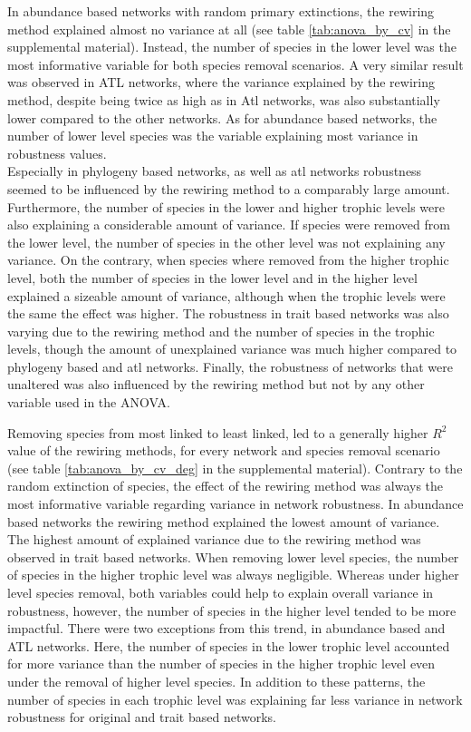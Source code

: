 \documentclass[12pt,a4paper]{article}
\begin{document}
In abundance based networks with random primary extinctions, the rewiring method explained almost no variance at all (see table \ref{tab:anova_by_cv} in the supplemental material). Instead, the number of species in the lower level was the most informative variable for both species removal scenarios. A very similar result was observed in ATL networks, where the variance explained by the rewiring method, despite being twice as high as in Atl networks, was also substantially lower compared to the other networks. As for abundance based networks, the number of lower level species was the variable explaining most variance in robustness values. \\ Especially in phylogeny based networks, as well as atl networks robustness seemed to be influenced by the rewiring method to a comparably large amount. Furthermore, the number of species in the lower and higher trophic levels were also explaining a considerable amount of variance. If species were removed from the lower level, the number of species in the other level was not explaining any variance. On the contrary, when species where removed from the higher trophic level, both the number of species in the lower level and in the higher level explained a sizeable amount of variance, although when the trophic levels were the same the effect was higher. The robustness in trait based networks was also varying due to the rewiring method and the number of species in the trophic levels, though the amount of unexplained variance was much higher compared to phylogeny based and atl networks. Finally, the robustness of networks that were unaltered was also influenced by the rewiring method but not by any other variable used in the ANOVA. \par
Removing species from most linked to least linked, led to a generally higher $R^2$ value of the rewiring methods, for every network and species removal scenario (see table \ref{tab:anova_by_cv_deg} in the supplemental material). Contrary to the random extinction of species, the effect of the rewiring method was always the most informative variable regarding variance in network robustness. In abundance based networks the rewiring method explained the lowest amount of variance. The highest amount of explained variance due to the rewiring method was observed in trait based networks. When removing lower level species, the number of species in the higher trophic level was always negligible. Whereas under higher level species removal, both variables could help to explain overall variance in robustness, however, the number of species in the higher level tended to be more impactful. There were two exceptions from this trend, in abundance based and ATL networks. Here, the number of species in the lower trophic level accounted for more variance than the number of species in the higher trophic level even under the removal of higher level species. In addition to these patterns, the number of species in each trophic level was explaining far less variance in network robustness for original and trait based networks. 
\end{document}

